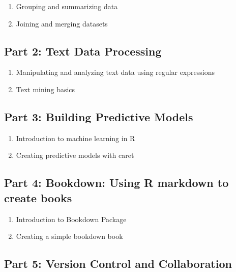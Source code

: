 \documentclass[
]{book}
\providecommand{\tightlist}{%
  \setlength{\itemsep}{0pt}\setlength{\parskip}{0pt}}
\begin{document}
\begin{enumerate}
\def\labelenumi{\arabic{enumi}.}
\tightlist
\item
  Grouping and summarizing data
\item
  Joining and merging datasets
\end{enumerate}

\subsection*{Part 2: Text Data Processing}\label{part-2-text-data-processing}

\begin{enumerate}
\def\labelenumi{\arabic{enumi}.}
\tightlist
\item
  Manipulating and analyzing text data using regular expressions
\item
  Text mining basics
\end{enumerate}

\subsection*{Part 3: Building Predictive Models}\label{part-3-building-predictive-models}

\begin{enumerate}
\def\labelenumi{\arabic{enumi}.}
\tightlist
\item
  Introduction to machine learning in R
\item
  Creating predictive models with caret
\end{enumerate}

\subsection*{Part 4: Bookdown: Using R markdown to create books}\label{part-4-bookdown-using-r-markdown-to-create-books}

\begin{enumerate}
\def\labelenumi{\arabic{enumi}.}
\tightlist
\item
  Introduction to Bookdown Package
\item
  Creating a simple bookdown book
\end{enumerate}

\subsection*{Part 5: Version Control and Collaboration}\label{part-5-version-control-and-collaboration}
\end{document}
